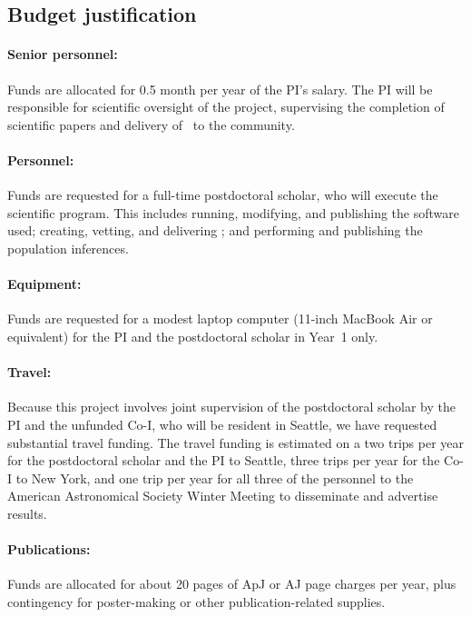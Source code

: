 \documentclass[12pt]{article}
\begin{document}
\subsection*{Budget justification}

\paragraph{Senior personnel:}
Funds are allocated for 0.5 month per year of the PI's salary.
The PI will be responsible for scientific oversight of the project,
supervising the completion of scientific papers and delivery of
\catalogname\ to the community.

\paragraph{Personnel:}
Funds are requested for a full-time postdoctoral scholar, who will
execute the scientific program.
This includes running, modifying, and publishing the software used;
creating, vetting, and delivering \catalogname;
and performing and publishing the population inferences.

\paragraph{Equipment:}
Funds are requested for a modest laptop computer (11-inch MacBook Air
or equivalent) for the PI and the postdoctoral scholar in Year~1 only.

\paragraph{Travel:}
Because this project involves joint supervision of the postdoctoral
scholar by the PI and the unfunded Co-I, who will be resident in
Seattle, we have requested substantial travel funding.
The travel funding is estimated on a two trips per year for the
postdoctoral scholar and the PI to Seattle, three trips per year
for the Co-I to New York, and one trip per year for all three of
the personnel to the American Astronomical
Society Winter Meeting to disseminate and advertise results.

\paragraph{Publications:}
Funds are allocated for about 20 pages of ApJ or AJ page charges per
year, plus contingency for poster-making or other publication-related
supplies.
\end{document}
